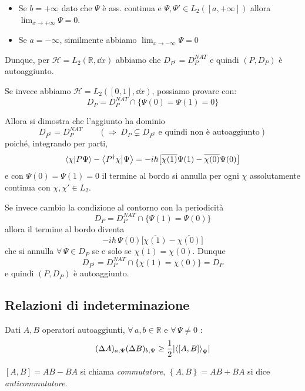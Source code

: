 \begin{itemize}
    \item Se \(b = +\infty\) dato che \(\Psi\) è ass. continua e \(\Psi, \Psi' \in L_2([a, +\infty])\) allora \(\lim_{x\to +\infty} \Psi= 0\).
    \item Se \(a = -\infty\), similmente abbiamo \(\lim_{x \to - \infty} \Psi=0\)
\end{itemize}
Dunque, per \(\mathcal{H}= L_2(\mathbb{R}, \dd{x})\) abbiamo che \(D_{P^\dagger}= D_{P}^{NAT}\) e quindi \((P, D_P)\) è autoaggiunto.

Se invece abbiamo \(\mathcal{H} = L_2([0,1], \dd{x})\), possiamo provare con:
\[
    D_P = D_P^{NAT} \cap \big\{ \Psi(0)=\Psi(1)=0 \big\}
\]

Allora si dimostra che l'aggiunto ha dominio
\[
    D_{P^\dagger}= D_P^{NAT} \qquad (\Rightarrow \ D_P \subsetneq D_{P^\dagger} \text{ e quindi non è autoaggiunto})
\]
poiché, integrando per parti,
\[
    \braket{\chi}{P\Psi}-\braket{P^\dagger\chi}{\Psi}
    = -i\hbar\big[\overline{\chi(1)}\Psi(1)-\overline{\chi(0)}\Psi(0)\big]
\]
e con \(\Psi(0)=\Psi(1)=0\) il termine al bordo si annulla per ogni \(\chi\) assolutamente continua con \(\chi,\chi'\in L_2\).

Se invece cambio la condizione al contorno con la periodicità
\[
    D_P = D_P^{NAT} \cap \big\{ \Psi(1)=\Psi(0) \big\}
\]
allora il termine al bordo diventa
\[
    -i\hbar\,\Psi(0)\big[\overline{\chi(1)}-\overline{\chi(0)}\big]
\]
che si annulla \(\forall\,\Psi\in D_P\) se e solo se \(\chi(1)=\chi(0)\). Dunque
\[
    D_{P^\dagger}= D_P^{NAT} \cap \big\{ \chi(1)=\chi(0) \big\}= D_P
\]
e quindi \((P,D_P)\) è autoaggiunto.



\subsection{Relazioni di indeterminazione}

\begin{theorem}
    Dati \(A, B\) operatori autoaggiunti, \(\forall \, a,b \in \mathbb{ R}\) e \(\forall\, \Psi\neq 0 \) :
    \begin{equation}
        (\Delta A )_{a,\Psi} (\Delta B )_{b, \Psi}\geq \frac{1}{2}\abs{\expval{[A,B]}_\Psi}
    \end{equation}
\end{theorem}
\begin{remark}
    \([A,B]= AB-BA \) si chiama \textit{commutatore}, \(\left\{ A, B \right\} = AB+BA \) si dice \textit{anticommutatore}.
\end{remark}

